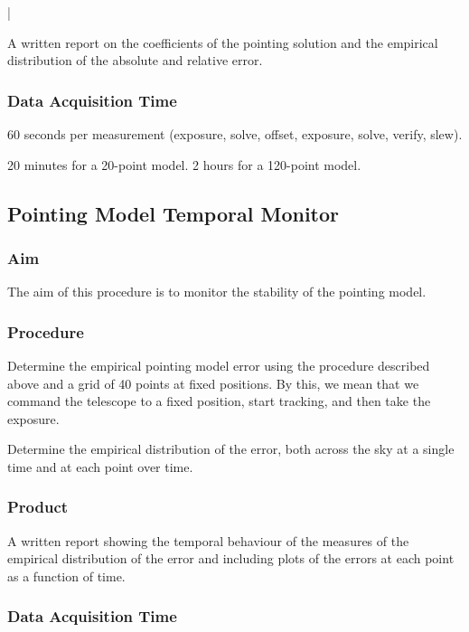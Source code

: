 |\documentclass{article}
\begin{document}
A written report on the coefficients of the pointing solution and the empirical distribution of the absolute and relative error.

\subsubsection{Data Acquisition Time}

60 seconds per measurement (exposure, solve, offset, exposure, solve, verify, slew).

20 minutes for a 20-point model. 2 hours for a 120-point model.


\subsection{Pointing Model Temporal Monitor}

\subsubsection{Aim}

The aim of this procedure is to monitor the stability of the pointing model.

\subsubsection{Procedure}

Determine the empirical pointing model error using the procedure described above and a grid of 40 points at fixed positions. By this, we mean that we command the telescope to a fixed position, start tracking, and then take the exposure.

Determine the empirical distribution of the error, both across the sky at a single time and at each point over time.

\subsubsection{Product}

A written report showing the temporal behaviour of the measures of the empirical distribution of the error and including plots of the errors at each point as a function of time.

\subsubsection{Data Acquisition Time}
\end{document}
